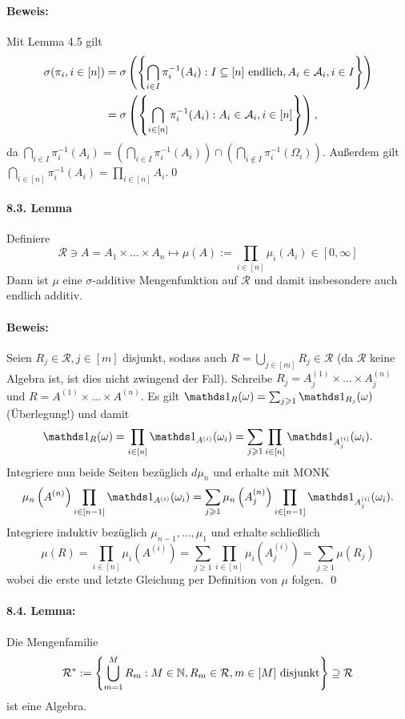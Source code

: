 \paragraph{Beweis:} Mit Lemma 4.5 gilt
\begin{align*}
	\sigma(\pi_i,i\in[n])&=\sigma\left(\left\{\bigcap_{i\in I}\pi_i^{-1}(A_i):I\subseteq[n]\text{ endlich},A_i\in\mathcal{A}_i, i\in I\right\}\right)\\
	&=\sigma\left(\left\{\bigcap_{i\in[n]}\pi_i^{-1}(A_i):A_i\in\mathcal{A}_i, i\in [n]\right\}\right),
\end{align*}
da $\bigcap_{i\in I}\pi_i^{-1}(A_i)=\left(\bigcap_{i\in I}\pi_i^{-1}(A_i)\right)\cap \left(\bigcap_{i\notin I}\pi_i^{-1}(\Omega_i)\right)$. Au\ss{}erdem gilt $\bigcap_{i\in[n]}\pi_i^{-1}(A_i)=\prod_{i\in[n]}A_i$.\qed

\paragraph{8.3. Lemma}Definiere 
$$\mathcal{R}\ni A=A_1\times\hdots\times A_n\mapsto\mu(A):=\prod_{i\in[n]}\mu_i(A_i)\in[0,\infty]$$
Dann ist $\mu$ eine $\sigma$-additive Mengenfunktion auf $\mathcal{R}$ und damit insbesondere auch endlich additiv. 

\paragraph{Beweis:}Seien $R_j\in\mathcal{R},j\in[m]$ disjunkt, sodass auch $R=\bigcup_{j\in[m]}R_j\in\mathcal{R}$ (da $\mathcal{R}$ keine Algebra ist, ist dies nicht zwingend der Fall). Schreibe $R_j=A_j^{(1)}\times\hdots\times A_j^{(n)}$ und $R=A^{(1)}\times\hdots\times A^{(n)}$. Es gilt $\ind{R}(\omega)=\sum_{j\geq1}\ind{R_j}(\omega)$ (\"Uberlegung!) und damit
\begin{align*}
	\ind{R}(\omega)=\prod_{i\in[n]}\ind{A^{(i)}}(\omega_i)=\sum_{j\geq1}\prod_{i\in[n]}\ind{A_j^{(i)}}(\omega_i).
\end{align*}
Integriere nun beide Seiten bez\"uglich $d\mu_n$ und erhalte mit MONK
$$\mu_n\left(A^{(n)}\right)\prod_{i\in[n-1]}\ind{A^{(i)}}(\omega_i)=\sum_{j\geq1}\mu_n\left(A_j^{(n)}\right)\prod_{i\in[n-1]}\ind{A_j^{(i)}}(\omega_i).$$
Integriere induktiv bez\"uglich $\mu_{n-1},\hdots,\mu_1$ und erhalte schlie\ss{}lich
$$\mu(R)=\prod_{i\in[n]}\mu_i\left(A^{(i)}\right)=\sum_{j\geq1}\prod_
{i\in[n]}\mu_i\left(A_j^{(i)}\right)=\sum_{j\geq1}\mu(R_j)$$
wobei die erste und letzte Gleichung per Definition von $\mu$ folgen. \qed


\paragraph{8.4. Lemma:} Die Mengenfamilie
$$\mathcal{R}^*:=\left\{\bigcup_{m=1}^MR_m:M\in\mathbb{N} , R_m\in\mathcal{R},m\in [M]\text{ disjunkt}\right\}\supseteq\mathcal{R}$$ 
ist eine Algebra.

